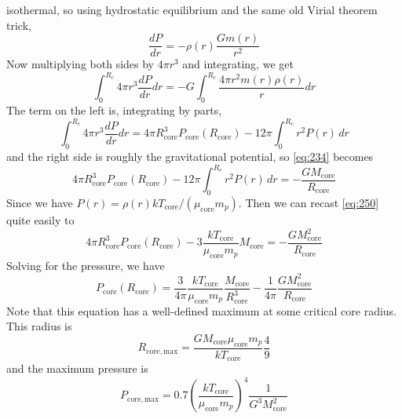 \documentclass[10pt]{article}
\numberwithin{equation}{section}
\begin{document}
    isothermal, so using hydrostatic equilibrium and the same old
    Virial theorem trick,
    \begin{equation}
      \label{eq:248}
      \frac{dP}{dr}=-\rho(r)\frac{Gm(r)}{r^2}
    \end{equation}
    Now multiplying both sides by $4\pi r^3$ and integrating, we get
    \begin{equation}
      \label{eq:234}
      \int_0^{R_c}4\pi r^3\frac{dP}{dr}dr=-G\int_0^{R_c}\frac{4\pi r^2m(r)
\rho(r)}{r}dr
    \end{equation}
    The term on the left is, integrating by parts,
    \begin{equation}
      \label{eq:249}
      \int_0^{R_c}4\pi r^3\frac{dP}{dr}dr=4\pi
      R_{\mathrm{core}}^3P_{\mathrm{core}}(R_{\mathrm{core}})-12\pi\int_0^
{R_c}r^2P(r)\,dr
    \end{equation}
    and the right side is roughly the gravitational potential, so
    \eqref{eq:234} becomes
    \begin{equation}
      \label{eq:250}
      4\pi
      R_{\mathrm{core}}^3P_{\mathrm{core}}(R_{\mathrm{core}})-12\pi\int_0^
{R_c}r^2P(r)\,dr=-\frac{GM_{\mathrm{core}}}{R_{\mathrm{core}}}
    \end{equation}
    Since we have
    $P(r)=\rho(r)kT_{\mathrm{core}}/(\mu_{\mathrm{core}}m_p)$. Then we
    can recast \eqref{eq:250} quite easily to
    \begin{equation}
      \label{eq:251}
      4\pi R_{\mathrm{core}}^3P_{\mathrm{core}}(R_{\mathrm{core}})-3\frac
{kT_{\mathrm{core}}}{\mu_{\mathrm{core}}m_p}M_{\mathrm{core}}=-\frac{GM_
{\mathrm{core}}^2}{R_{\mathrm{core}}}
    \end{equation}
    Solving for the pressure, we have
    \begin{equation}
      \label{eq:252}
      P_{\mathrm{core}}(R_{\mathrm{core}})=\frac{3}{4\pi}\frac{kT_{\mathrm
{core}}}{\mu_{\mathrm{core}}m_p}\frac{M_{\mathrm{core}}}{R_{\mathrm{core}}
^3}-\frac{1}{4\pi}\frac{GM_{\mathrm{core}}^2}{R_{\mathrm{core}}}
    \end{equation}
    Note that this equation has a well-defined maximum at some
    critical core radius. This radius is
    \begin{equation}
      \label{eq:253}
      R_{\mathrm{core,
          max}}=\frac{GM_{\mathrm{core}}\mu_{\mathrm{core}}m_p}{k T_
{\mathrm{core}}}\frac{4}{9}
    \end{equation}
    and the maximum pressure is
    \begin{equation}
      \label{eq:254}
      P_{\mathrm{core,max}}=0.7\left(\frac{kT_{\mathrm{core}}}{\mu_{\mathrm
{core}}m_p}\right)^4\frac{1}{G^3 M_{\mathrm{core}}^2}
    \end{equation}
\end{document}
